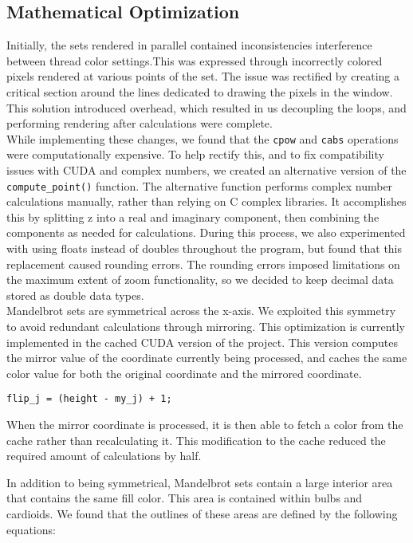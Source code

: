 \documentclass{article}
\begin{document}
\subsection{Mathematical Optimization}

Initially, the sets rendered in parallel contained inconsistencies interference between thread color settings.This was expressed through incorrectly colored pixels rendered at various points of the set.
The issue was rectified by creating a critical section around the lines dedicated to drawing the pixels in the window.
This solution introduced overhead, which resulted in us decoupling the loops, and performing rendering after calculations were complete.\\

While implementing these changes, we found that the \verb|cpow| and \verb|cabs| operations were computationally expensive.
To help rectify this, and to fix compatibility issues with CUDA and complex numbers, we created an alternative version of the \verb|compute_point()| function.
The alternative function performs complex number calculations manually, rather than relying on C complex libraries.
It accomplishes this by splitting z into a real and imaginary component, then combining the components as needed for calculations.
During this process, we also experimented with using floats instead of doubles throughout the program, but found that this replacement caused rounding errors.
The rounding errors imposed limitations on the maximum extent of zoom functionality, so we decided to keep decimal data stored as double data types.\\

Mandelbrot sets are symmetrical across the x-axis.
We exploited this symmetry to avoid redundant calculations through mirroring.
This optimization is currently implemented in the cached CUDA version of the project.
This version computes the mirror value of the coordinate currently being processed, and caches the same color value for both the original coordinate and the mirrored coordinate.

\begin{verbatim}
flip_j = (height - my_j) + 1;
\end{verbatim}

When the mirror coordinate is processed, it is then able to fetch a color from the cache rather than recalculating it.
This modification to the cache reduced the required amount of calculations by half.

In addition to being symmetrical, Mandelbrot sets contain a large interior area that contains the same fill color.
This area is contained within bulbs and cardioids.
We found that the outlines of these areas are defined by the following equations:
\end{document}
